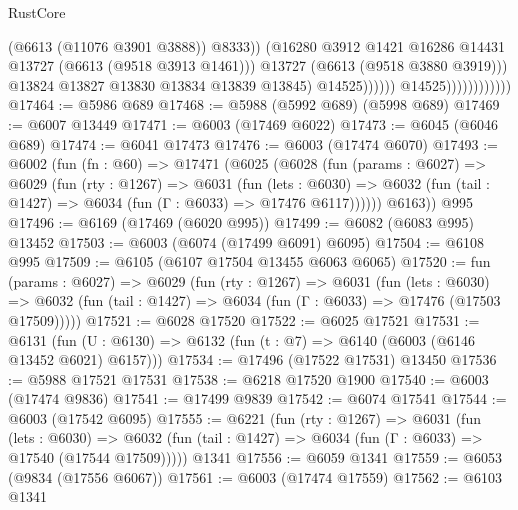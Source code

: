 \begin{lexlean}{RustCore}
\begin{coremodule}
                                                (@6613 (@11076 @3901 @3888))
                                                @8333))
                                            (@16280
                                              @3912
                                              @1421
                                              @16286
                                              @14431
                                              @13727
                                              (@6613 (@9518 @3913 @1461)))
                                            @13727
                                            (@6613 (@9518 @3880 @3919)))
                                          @13824
                                          @13827
                                          @13830
                                          @13834
                                          @13839
                                          @13845)
                                        @14525))))))
                            @14525))))))))))))
@17464 := @5986 @689
@17468 := @5988 (@5992 @689) (@5998 @689)
@17469 := @6007 @13449
@17471 := @6003 (@17469 @6022)
@17473 := @6045 (@6046 @689)
@17474 := @6041 @17473
@17476 := @6003 (@17474 @6070)
@17493 := @6002
    (fun (fn : @60) =>
    @17471
      (@6025
        (@6028
          (fun (params : @6027) =>
          @6029
            (fun (rty : @1267) =>
            @6031
              (fun (lets : @6030) =>
              @6032 (fun (tail : @1427) => @6034 (fun (Γ : @6033) => @17476 @6117))))))
        @6163))
    @995
@17496 := @6169 (@17469 (@6020 @995))
@17499 := @6082 (@6083 @995) @13452
@17503 := @6003 (@6074 (@17499 @6091) @6095)
@17504 := @6108 @995
@17509 := @6105 (@6107 @17504 @13455 @6063 @6065)
@17520 := fun (params : @6027) =>
  @6029
    (fun (rty : @1267) =>
    @6031
      (fun (lets : @6030) =>
      @6032 (fun (tail : @1427) => @6034 (fun (Γ : @6033) => @17476 (@17503 @17509)))))
@17521 := @6028 @17520
@17522 := @6025 @17521
@17531 := @6131
    (fun (U : @6130) => @6132 (fun (t : @7) => @6140 (@6003 (@6146 @13452 @6021) @6157)))
@17534 := @17496 (@17522 @17531) @13450
@17536 := @5988 @17521 @17531
@17538 := @6218 @17520 @1900
@17540 := @6003 (@17474 @9836)
@17541 := @17499 @9839
@17542 := @6074 @17541
@17544 := @6003 (@17542 @6095)
@17555 := @6221
    (fun (rty : @1267) =>
    @6031
      (fun (lets : @6030) =>
      @6032 (fun (tail : @1427) => @6034 (fun (Γ : @6033) => @17540 (@17544 @17509)))))
    @1341
@17556 := @6059 @1341
@17559 := @6053 (@9834 (@17556 @6067))
@17561 := @6003 (@17474 @17559)
@17562 := @6103 @1341

\end{coremodule}
\end{lexlean}
